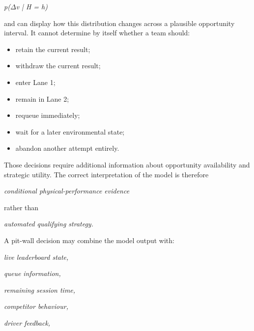 \begin{center}\textit{p(\ensuremath{\Delta}v | H = h)}\end{center}

and can display how this distribution changes across a plausible opportunity interval. It cannot determine by itself whether a team should:

\begin{itemize}
\item retain the current result;
\item withdraw the current result;
\item enter Lane 1;
\item remain in Lane 2;
\item requeue immediately;
\item wait for a later environmental state;
\item abandon another attempt entirely.
\end{itemize}

Those decisions require additional information about opportunity availability and strategic utility. The correct interpretation of the model is therefore

\begin{center}\textit{conditional physical-performance evidence}\end{center}

rather than

\begin{center}\textit{automated qualifying strategy.}\end{center}

A pit-wall decision may combine the model output with:

\begin{center}\textit{live leaderboard state,}\end{center}

\begin{center}\textit{queue information,}\end{center}

\begin{center}\textit{remaining session time,}\end{center}

\begin{center}\textit{competitor behaviour,}\end{center}

\begin{center}\textit{driver feedback,}\end{center}

